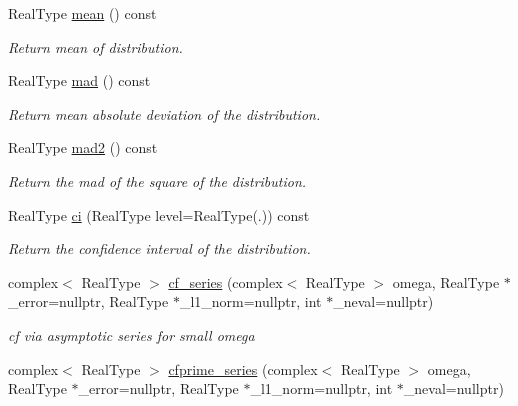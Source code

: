 \begin{DoxyCompactItemize}
Real\+Type \mbox{\hyperlink{structlognormal__distribution_a59152655fdac026bc8a8eb8abadc247f}{mean}} () const
\begin{DoxyCompactList}\small\item\em Return mean of distribution. \end{DoxyCompactList}\item 
\mbox{\label{structlognormal__distribution_ac7b2143d799524dd1c4e2661225ff6c7}} 
Real\+Type \mbox{\hyperlink{structlognormal__distribution_ac7b2143d799524dd1c4e2661225ff6c7}{mad}} () const
\begin{DoxyCompactList}\small\item\em Return mean absolute deviation of the distribution. \end{DoxyCompactList}\item 
Real\+Type \mbox{\hyperlink{structlognormal__distribution_a41c93e0aac16e184161abc486a61319a}{mad2}} () const
\begin{DoxyCompactList}\small\item\em Return the mad of the square of the distribution. \end{DoxyCompactList}\item 
\mbox{\label{structlognormal__distribution_ab2ecb3bc59203c7ea4acfe8a1d3ab332}} 
Real\+Type \mbox{\hyperlink{structlognormal__distribution_ab2ecb3bc59203c7ea4acfe8a1d3ab332}{ci}} (Real\+Type level=Real\+Type(.)) const
\begin{DoxyCompactList}\small\item\em Return the confidence interval of the distribution. \end{DoxyCompactList}\item 
complex$<$ Real\+Type $>$ \mbox{\hyperlink{structlognormal__distribution_a46b1bc0ea6c8a46bc341165be2ca47fe}{cf\+\_\+series}} (complex$<$ Real\+Type $>$ omega, Real\+Type $\ast$\+\_\+error=nullptr, Real\+Type $\ast$\+\_\+l1\+\_\+norm=nullptr, int $\ast$\+\_\+neval=nullptr)
\begin{DoxyCompactList}\small\item\em cf via asymptotic series for small omega \end{DoxyCompactList}\item 
complex$<$ Real\+Type $>$ \mbox{\hyperlink{structlognormal__distribution_a0a0adae1494c1614dc15ff7f4c5a9a02}{cfprime\+\_\+series}} (complex$<$ Real\+Type $>$ omega, Real\+Type $\ast$\+\_\+error=nullptr, Real\+Type $\ast$\+\_\+l1\+\_\+norm=nullptr, int $\ast$\+\_\+neval=nullptr)

\end{DoxyCompactItemize}
